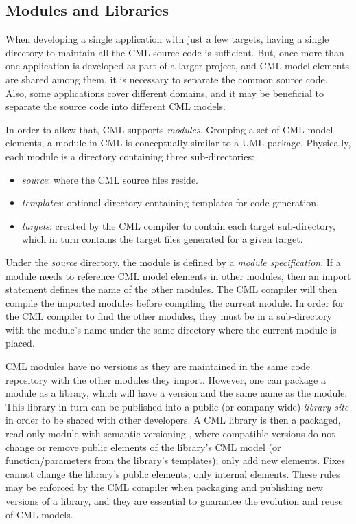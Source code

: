 \subsection{Modules and Libraries}\label{subsec:modlib}

When developing a single application with just a few targets,
having a single directory to maintain all the CML source code is sufficient.
But, once more than one application is developed as part of a larger project,
and CML model elements are shared among them,
it is necessary to separate the common source code.
Also, some applications cover different domains,
and it may be beneficial to separate the source code into different CML models.

In order to allow that, CML supports \emph{modules}.
Grouping a set of CML model elements,
a module in CML is conceptually similar to a UML \cite{uml} package.
Physically, each module is a directory containing three sub-directories:

\begin{itemize}
\item \emph{source}: where the CML source files reside.
\item \emph{templates}: optional directory containing templates for code generation.
\item \emph{targets}: created by the CML compiler to contain each target sub-directory, which in turn contains the target files generated for a given target.
\end{itemize}

Under the \emph{source} directory, the module is defined by a \emph{module specification}.
If a module needs to reference CML model elements in other modules,
then an import statement defines the name of the other modules.
The CML compiler will then compile the imported modules
before compiling the current module.
In order for the CML compiler to find the other modules,
they must be in a sub-directory with the module's name
under the same directory where the current module is placed.

CML modules have no versions
as they are maintained in the same code repository with the other modules they import.
However, one can package a module as a library,
which will have a version and the same name as the module.
This library in turn can be published into a public (or company-wide) \emph{library site}
in order to be shared with other developers.
A CML library is then a packaged, read-only module with semantic versioning \cite{semver},
where compatible versions do not change or remove public elements of the library's CML model (or function/parameters from the library's templates); only add new elements.
Fixes cannot change the library's public elements; only internal elements.
These rules may be enforced by the CML compiler when packaging and publishing new versions of a library, and they are essential to guarantee the evolution and reuse of CML models.
